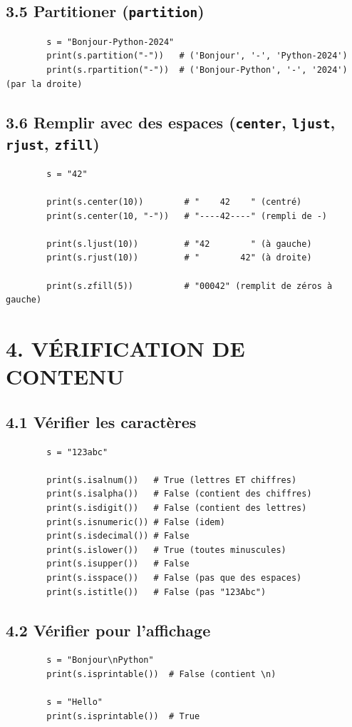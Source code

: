 \documentclass[12pt,a4paper]{article}
\begin{document}
	\subsection*{\color{cyan}3.5 Partitioner (\texttt{partition})}
	\begin{lstlisting}
		s = "Bonjour-Python-2024"
		print(s.partition("-"))   # ('Bonjour', '-', 'Python-2024')
		print(s.rpartition("-"))  # ('Bonjour-Python', '-', '2024') (par la droite)
	\end{lstlisting}
	
	\subsection*{\color{cyan}3.6 Remplir avec des espaces (\texttt{center}, \texttt{ljust}, \texttt{rjust}, \texttt{zfill})}
	\begin{lstlisting}
		s = "42"
		
		print(s.center(10))        # "    42    " (centré)
		print(s.center(10, "-"))   # "----42----" (rempli de -)
		
		print(s.ljust(10))         # "42        " (à gauche)
		print(s.rjust(10))         # "        42" (à droite)
		
		print(s.zfill(5))          # "00042" (remplit de zéros à gauche)
	\end{lstlisting}
	
	\section*{\color{orange}4. VÉRIFICATION DE CONTENU}
	
	\subsection*{\color{cyan}4.1 Vérifier les caractères}
	\begin{lstlisting}
		s = "123abc"
		
		print(s.isalnum())   # True (lettres ET chiffres)
		print(s.isalpha())   # False (contient des chiffres)
		print(s.isdigit())   # False (contient des lettres)
		print(s.isnumeric()) # False (idem)
		print(s.isdecimal()) # False
		print(s.islower())   # True (toutes minuscules)
		print(s.isupper())   # False
		print(s.isspace())   # False (pas que des espaces)
		print(s.istitle())   # False (pas "123Abc")
	\end{lstlisting}
	
	\subsection*{\color{cyan}4.2 Vérifier pour l'affichage}
	\begin{lstlisting}
		s = "Bonjour\nPython"
		print(s.isprintable())  # False (contient \n)
		
		s = "Hello"
		print(s.isprintable())  # True
	\end{lstlisting}
	
\end{document}
